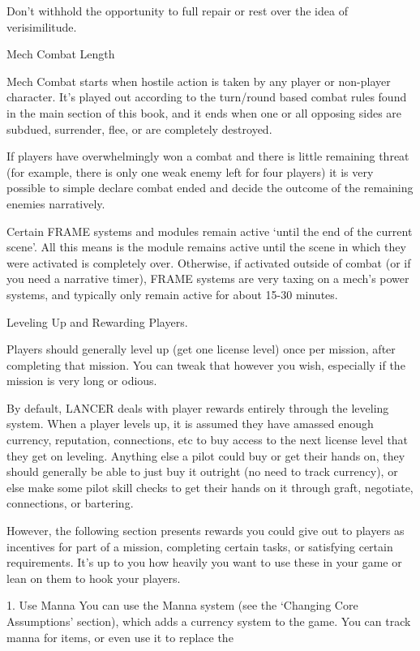 Don’t withhold the opportunity to full repair or rest over the idea of verisimilitude.


                                          Mech Combat Length

Mech Combat starts when hostile action is taken by any player or non-player character. It’s
played out according to the turn/round based combat rules found in the main section of this
book, and it ends when one or all opposing sides are subdued, surrender, flee, or are completely
destroyed.


If players have overwhelmingly won a combat and there is little remaining threat (for example,
there is only one weak enemy left for four players) it is very possible to simple declare combat
ended and decide the outcome of the remaining enemies narratively.


Certain FRAME systems and modules remain active ‘until the end of the current scene’. All this
means is the module remains active until the scene in which they were activated is completely
over. Otherwise, if activated outside of combat (or if you need a narrative timer), FRAME systems
are very taxing on a mech’s power systems, and typically only remain active for about 15-30
minutes.


                                 Leveling Up and Rewarding Players.

Players should generally level up (get one license level) once per mission, after completing that
mission. You can tweak that however you wish, especially if the mission is very long or odious.


By default, LANCER deals with player rewards entirely through the leveling system. When a
player levels up, it is assumed they have amassed enough currency, reputation, connections, etc
to buy access to the next license level that they get on leveling. Anything else a pilot could buy
or get their hands on, they should generally be able to just buy it outright (no need to track
currency), or else make some pilot skill checks to get their hands on it through graft, negotiate,
connections, or bartering.


However, the following section presents rewards you could give out to players as incentives for
part of a mission, completing certain tasks, or satisfying certain requirements. It’s up to you how
heavily you want to use these in your game or lean on them to hook your players.


1. Use Manna
You can use the Manna system (see the ‘Changing Core Assumptions’ section), which adds a
currency system to the game. You can track manna for items, or even use it to replace the




